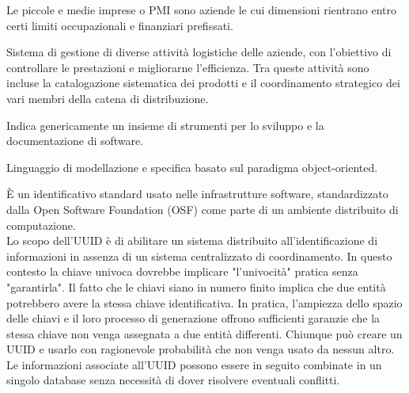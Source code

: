 \begin{acronym}[HTML5]
	
	{\small Le piccole e medie imprese o PMI sono aziende le cui dimensioni rientrano entro certi limiti occupazionali e finanziari prefissati. \par}

	
	{\small Sistema di gestione di diverse attività logistiche delle aziende, con l'obiettivo di controllare le prestazioni e migliorarne l'efficienza. Tra queste attività sono incluse la catalogazione sistematica dei prodotti e il coordinamento strategico dei vari membri della catena di distribuzione. \par}

	
	{\small Indica genericamente un insieme di strumenti per lo sviluppo e la documentazione di software. \par}

	
	{\small  Linguaggio di modellazione e specifica basato sul paradigma object-oriented. \par}
	
	
	{\small È un identificativo standard usato nelle infrastrutture software, standardizzato dalla Open Software Foundation (OSF) come parte di un ambiente distribuito di computazione.\\
Lo scopo dell'UUID è di abilitare un sistema distribuito all'identificazione di informazioni in assenza di un sistema centralizzato di coordinamento. In questo contesto la chiave univoca dovrebbe implicare "l'univocità" pratica senza "garantirla". Il fatto che le chiavi siano in numero finito implica che due entità potrebbero avere la stessa chiave identificativa. In pratica, l'ampiezza dello spazio delle chiavi e il loro processo di generazione offrono sufficienti garanzie che la stessa chiave non venga assegnata a due entità differenti. Chiunque può creare un UUID e usarlo con ragionevole probabilità che non venga usato da nessun altro. Le informazioni associate all'UUID possono essere in seguito combinate in un singolo database senza necessità di dover risolvere eventuali conflitti. \par}
\end{acronym}
